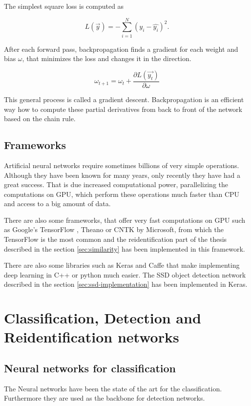 \documentclass[a4paper,12pt,titlepage]{article}
\numberwithin{figure}{section}
\begin{document}
The simplest square loss is computed as 

\begin{equation}
 L(\overrightarrow{y}) = - \sum_{i=1}^N(y_i -  \hat{y_i})^2.
\end{equation} 

After each forward pass, backpropagation finds a gradient for each weight and bias $\omega$, that minimizes the loss and changes it in the direction. 

\begin{equation}
\omega_{t + 1} = \omega_{t} + \frac{\partial L(\overrightarrow{y_t})}{\partial \omega}
\end{equation}

This general process is called a gradient descent. Backpropagation is an efficient way how to  compute these partial derivatives from back to front of the network based on the chain rule.

\subsection{Frameworks}
Artificial neural networks require sometimes billions of very simple operations. Although they have been known for many years\cite{widrow199030}, only recently they have had a great success. That is due increased computational power, parallelizing the computations on GPU, which perform these operations much faster than CPU and access to a big amount of data. 

There are also some frameworks, that offer very fast computations on GPU such as Google's TensorFlow \cite{abadi2016tensorflow}, Theano \cite{bergstra2011theano} or CNTK\cite{seide2016cntk} by Microsoft, from which the TensorFlow is the most common and the reidentification part of the thesis described in the section \ref{sec:similarity} has been implemented in this framework. 

There are also some libraries such as Keras \cite{chollet2015keras} and Caffe \cite{jia2014caffe} that make implementing deep learning in C++ or python much easier. The SSD object detection network described in the section \ref{sec:ssd-implementation} has been implemented in Keras.



\section{Classification, Detection and Reidentification networks}
\subsection{Neural networks for classification}
\label{sec:neural_networks_classification}
The Neural networks have been the state of the art for the classification. Furthermore they are used as the backbone for detection networks.
\end{document}
